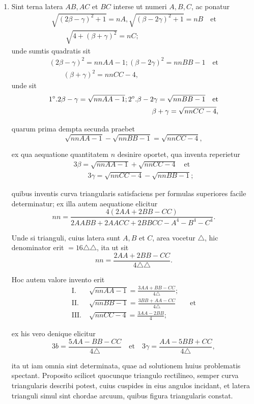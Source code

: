 \documentclass[10pt,a4paper]{article}
\begin{document}
\begin{paracol}{2}
\begin{enumerate}[topsep=1px]
		\item Sint terna latera $AB, AC$ et $BC$ interse ut numeri $A, B, C$, ac ponatur
		\begin{align*}
			\sqrt{(2\beta - \gamma)^2+1} = nA, \sqrt{(\beta-2\gamma)^2+1} = nB \quad \text{et}\\
			\qquad \sqrt{4+(\beta + \gamma)^2}= nC;
		\end{align*}
		unde sumtis quadratis sit
		\begin{align*}
			(2\beta- \gamma)^2 = nnAA - 1; (\beta-2\gamma )^2= nnBB-1\quad \text{et}\\
			\qquad (\beta+\gamma)^2= nnCC-4,
		\end{align*}
		unde sit
		\begin{align*}
			\text{1}\degree. 2\beta - \gamma = \sqrt{nnAA-1}; \text{2}\degree. \beta - 2\gamma = \sqrt{nnBB-1}\quad \text{et}\\
			\qquad \beta + \gamma = \sqrt{nnCC-4},
		\end{align*}
		\par quarum prima dempta secunda praebet
		\[
			\sqrt{nnAA-1}-\sqrt{nnBB-1} = \sqrt{nnCC-4},
		\]
		\par ex qua aequatione quantitatem $n$ desinire oportet, qua inventa reperietur
		\begin{align*}
			3\beta = \sqrt{nnAA-1}+\sqrt{nnCC-4} \quad \text{et}\\
			\qquad 3\gamma = \sqrt{nnCC-4}-\sqrt{nnBB-1};
		\end{align*}
		\par quibus inventis curva triangularis satisfaciens per formulas superiores facile determinatur; ex illa autem aequatione elicitur
		\[
			nn = \frac{4(2AA+2BB-CC)}{2AABB+2AACC+2BBCC-A^4-B^4-C^4}.
		\]
		\par Unde si trianguli, cuius latera sunt $A, B$ et $C$, area vocetur $\triangle$, hic denominator erit $=16 \triangle \triangle$, ita ut sit
		\[
			nn=\frac{2AA+2BB-CC}{4 \triangle \triangle}.
		\]
		\par Hoc autem valore invento erit
		\begin{align*}
			\text{I}. \;& \sqrt{nnAA-1} = \frac{3AA+BB-CC}{4\triangle};\\
			\text{II}. \; & \sqrt{nnBB-1} = \frac{3BB+AA-CC}{4\triangle} \qquad \text{et}\\
			\text{III}. \;& \sqrt{nnCC-4} = \frac{3AA-2BB}{4};
		\end{align*}
		\par ex his vero denique elicitur
		\[
			3b = \frac{5AA-BB-CC}{4\triangle} \quad \text{et} \quad 3\gamma = \frac{AA-5BB+CC}{4\triangle},
		\]
		\par ita ut iam omnia sint determinata, quae ad solutionem huius problematis spectant. Proposito scilicet quocunque triangulo rectilineo, semper curva triangularis describi potest, cuius cuspides in eius angulos incidant, et latera trianguli simul sint chordae arcuum, quibus figura triangularis constat.
		

\end{enumerate}
\end{paracol}
\end{document}
